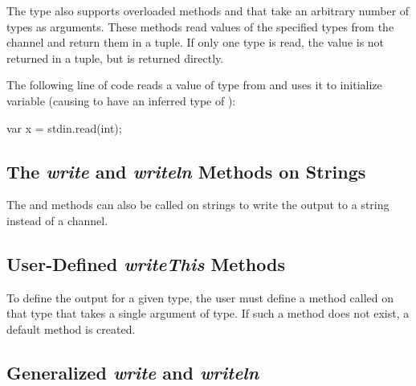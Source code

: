 The  type also supports overloaded methods 
and  that take an arbitrary number of types as arguments.
These methods read values of the specified types from the channel and
return them in a tuple.  If only one type is read, the value is not
returned in a tuple, but is returned directly.

\begin{example}
The following line of code reads a value of type  from
 and uses it to initialize variable  (causing
 to have an inferred type of ):
\begin{chapel}
var x = stdin.read(int);
\end{chapel}
\end{example}


\subsection{The {\em write} and {\em writeln} Methods on Strings}
\label{stringwrite}

The  and  methods can also be called on
strings to write the output to a string instead of a channel.




\subsection{User-Defined {\em writeThis} Methods}

To define the output for a given type, the user must define a method
called  on that type that takes a single argument of
 type.  If such a method does not exist, a default method is
created.




\subsection{Generalized {\em write} and {\em writeln}}
\label{writer}

